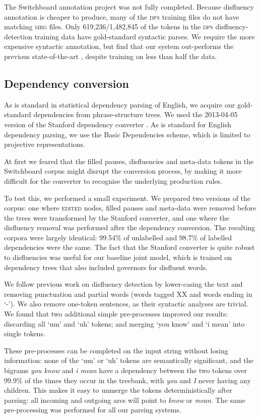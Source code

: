 \documentclass[11pt,letterpaper]{article}
\begin{document}
The Switchboard annotation project was not fully completed.
Because disfluency annotation is cheaper to produce, many of the \textsc{dps}
training files do not have matching \textsc{mrg} files.
Only 619,236/1,482,845 of the tokens
in the \textsc{dps} disfluency-detection training data have gold-standard syntactic
parses.  We require the more expensive syntactic annotation,
but find that our system out-performs the previous state-of-the-art \citep{qian:13},
despite training on less than half the data.


\subsection{Dependency conversion}

\label{sec:deps}
As is standard in statistical dependency parsing of English, we acquire our
gold-standard dependencies from phrase-structure trees.
We used the 2013-04-05 version of the Stanford dependency converter \citep{stanford_deps}.
As is standard for English dependency parsing, we use the Basic Dependencies scheme,
which is limited to projective representations.

At first we feared that the filled pauses, disfluencies and meta-data tokens in
the Switchboard corpus might disrupt the conversion process, by making it more
difficult for the converter to recognise the underlying production rules.

To test this, we performed a small experiment. We prepared two versions of the corpus:
one where \textsc{edited} nodes, filled pauses and meta-data were removed before
the trees were transformed by the Stanford converter, and one where the disfluency
removal was performed after the dependency conversion. The resulting corpora
were largely identical: 99.54\% of unlabelled and 98.7\% of labelled dependencies
were the same. The fact that the Stanford converter is quite robust to disfluencies
was useful for our baseline joint model, which is
trained on dependency trees that also included governors for disfluent words.

We follow previous work on disfluency detection by lower-casing the text and
removing punctuation and partial words (words tagged XX and words ending in
`-').  We also remove one-token sentences, as their syntactic
analyses are trivial.
We found that two additional simple pre-processes improved our results: discarding
all `um' and `uh' tokens; and merging `you know' and `i mean' into single tokens.

These pre-processes can be completed on the input string without losing information:
none of the `um' or `uh' tokens are semantically significant, and
the bigrams \emph{you know} and \emph{i mean} have a dependency between the two
tokens over 99.9\% of the times they occur in the treebank, with \emph{you} and \emph{I}
never having any children. This makes it easy to unmerge the tokens deterministically
after parsing:
all incoming and outgoing arcs will point to \emph{know} or \emph{mean}.
The same pre-processing was performed for all our parsing systems.
\end{document}
